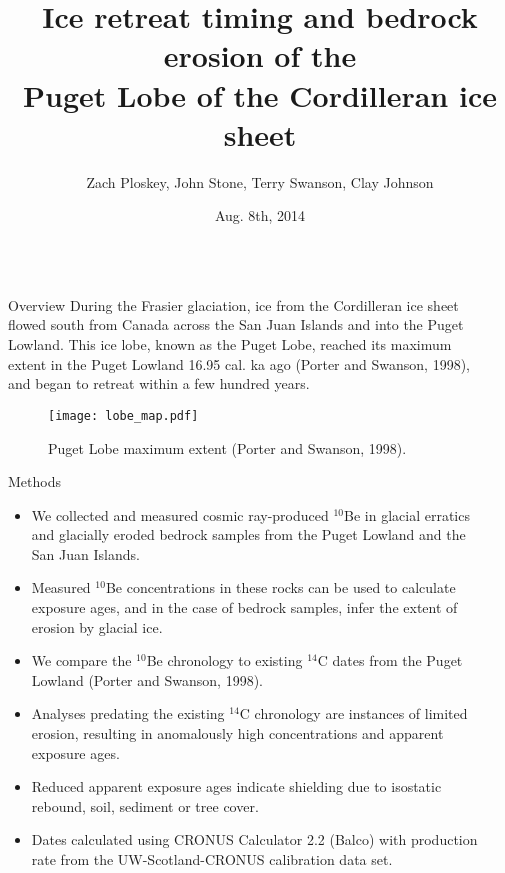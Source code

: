 \documentclass{beamer}
\title{Ice retreat timing and bedrock erosion of the\\Puget Lobe of the Cordilleran ice sheet}
\author{Zach Ploskey, John Stone, Terry Swanson, Clay Johnson}
\institute{Cosmogenic Nuclide Lab, Dept. of Earth and Space Sciences, University of Washington, Seattle}
\date{Aug. 8th, 2014}
\begin{document}
\begin{frame}{}\centering

\begin{columns}[T]

\begin{column}{0.32\columnwidth}

\begin{block}{Overview}	
During the Frasier glaciation, ice from the Cordilleran ice sheet flowed south from Canada across the San Juan Islands and into the Puget Lowland.
This ice lobe, known as the Puget Lobe, reached its maximum extent in the Puget Lowland 16.95 cal. ka ago  (Porter and Swanson, 1998), and began to retreat within a few hundred years.

\begin{figure}
\texttt{[image: lobe\_map.pdf]}
\caption*{Puget Lobe maximum extent (Porter and Swanson, 1998).}
\end{figure}

\end{block}

\begin{block}{Methods}
\begin{itemize}
\item We collected and measured cosmic ray-produced $^{10}$Be in glacial erratics and glacially eroded bedrock samples from the Puget Lowland and the San Juan Islands.
\item Measured $^{10}$Be concentrations in these rocks can be used to calculate exposure ages, and in the case of bedrock samples, infer the extent of erosion by glacial ice.
\item We compare the $^{10}$Be chronology to existing $^{14}$C dates from the Puget Lowland (Porter and Swanson, 1998).
\item Analyses predating the existing $^{14}$C chronology are instances of limited erosion, resulting in anomalously high concentrations and apparent exposure ages.
\item Reduced apparent exposure ages indicate shielding due to isostatic rebound, soil, sediment or tree cover.
\item Dates calculated using CRONUS Calculator 2.2 (Balco) with production rate from the UW-Scotland-CRONUS calibration data set.
\end{itemize}
\end{block}

\end{column}
	
\begin{column}{.32\columnwidth}


\end{column}
\end{columns}
\end{frame}
\end{document}
